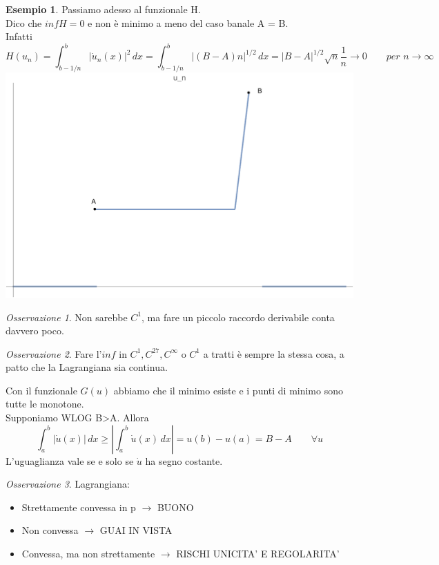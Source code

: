 \documentclass[a4paper]{book}
\theoremstyle{definition}
\newtheorem{ex}{Esempio}
\theoremstyle{remark}
\newtheorem{oss}{Osservazione}
\theoremstyle{definition}
\begin{document}
\begin{ex}
Passiamo adesso al funzionale H.\\
Dico che $infH = 0$ e non è minimo a meno del caso banale A = B.\\
Infatti
\[
	H(u_n)=\int_{b-1/n}^b |\dot u_n(x)|^2\,dx = \int_{b-1/n}^b |(B-A)n|^{1/2}\,dx = |B-A|^{1/2}\sqrt n \frac1n \to 0 \qquad \textit{per } n \to \infty
\]	
\includegraphics[scale=0.4]{u-n.pdf}

\begin{oss}
Non sarebbe $C^1$, ma fare un piccolo raccordo derivabile conta davvero poco.
\end{oss}

\begin{oss}
Fare l'$inf$ in $C^1, C^{27}, C^\infty$ o $C^1$ a tratti è sempre la stessa cosa, a patto che la Lagrangiana sia continua.
\end{oss}

Con il funzionale $G(u)$ abbiamo che il minimo esiste e i punti di minimo sono tutte le monotone.\\
Supponiamo WLOG B>A. Allora 
\[
	\int_a^b |\dot u(x)|\,dx \ge |\int_a^b \dot u(x)\,dx| = u(b) - u(a) = B-A \qquad \forall u
\]
L'uguaglianza vale se e solo se $\dot u$ ha segno costante.
\end{ex}

\begin{oss}
Lagrangiana:
\begin{itemize}
\item{Strettamente convessa in p $\to$ BUONO}
\item{Non convessa $\to$ GUAI IN VISTA}
\item{Convessa, ma non strettamente $\to$ RISCHI UNICITA' E REGOLARITA'}
\end{itemize}
\end{oss}
\end{document}
